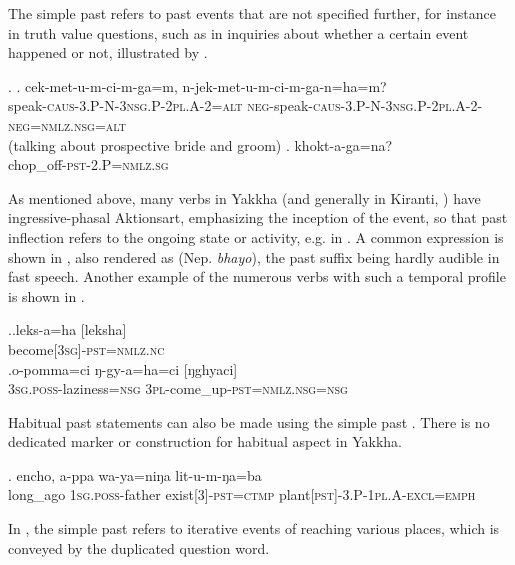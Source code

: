 The simple past  refers to past events that are not specified further, for instance in truth value questions, such as  in inquiries about whether a certain event happened or not, illustrated by \Next. 

\ex. \ag.  cek-met-u-m-ci-m-ga=m,                                    n-jek-met-u-m-ci-m-ga-n=ha=m?\\
speak{\scshape -caus-3.P-N-3nsg.P-2pl.A-2=alt} {\scshape neg-}speak{\scshape -caus-3.P-N-3nsg.P-2pl.A-2-neg=nmlz.nsg=alt}\\
 (talking about prospective bride and groom) 
\bg. khokt-a-ga=na?\\
chop\_off{\scshape -pst-2.P=nmlz.sg}\\
 


As mentioned above, many verbs in Yakkha (and generally in Kiranti, \citet[512]{Ebert2003Kiranti}) have ingressive-phasal Aktionsart, emphasizing the inception of the event, so that past inflection refers to the ongoing state or activity, e.g. in \Last[b]. A common expression is shown in \Next[a], also rendered as  (Nep. \emph{bhayo}), the past suffix being hardly audible in fast speech. Another example of the numerous verbs with such a temporal profile is shown in \Next[b].

\ex.\ag.leks-a=ha [leksha]\\
become{\scshape [3sg]-pst=nmlz.nc}\\
\bg.o-pomma=ci ŋ-gy-a=ha=ci [ŋghyaci]\\
{\scshape 3sg.poss-}laziness{\scshape =nsg} {\scshape 3pl-}come\_up{\scshape -pst=nmlz.nsg=nsg}\\

Habitual past statements can also be made using the simple past \Next. There is no dedicated marker or construction for habitual aspect in Yakkha.

\exg. encho,        a-ppa             wa-ya=niŋa               lit-u-m-ŋa=ba\\
long\_ago {\scshape 1sg.poss-}father exist{\scshape [3]-pst=ctmp} plant{\scshape [pst]-3.P-1pl.A-excl=emph}\\
 

In \Next, the simple past refers to iterative events of reaching various places, which is conveyed by the duplicated question word.

